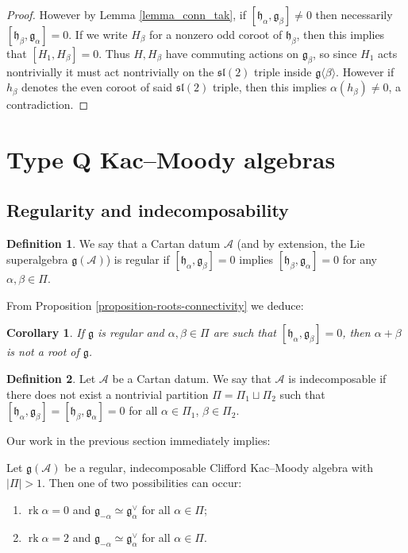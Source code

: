 \documentclass[12pt, a4paper, reqno]{amsart}
\def\AA{\mathcal{A}}
\def\g{\mathfrak{g}}
\def\h{\mathfrak{h}}
\def\l{\mathfrak{l}}
\def\s{\mathfrak{s}}
\def\rk{\operatorname{rk}}
\newtheorem{corollary}{Corollary}
\theoremstyle{definition}
\newtheorem{definition}{Definition}
\theoremstyle{definition}
\theoremstyle{definition}
\numberwithin{theorem}{section}
\numberwithin{lemma}{section}
\numberwithin{remark}{section}
\numberwithin{definition}{section}
\numberwithin{corollary}{section}
\numberwithin{proposition}{section}
\numberwithin{example}{section}
\begin{document}
\begin{proof}
		However by Lemma \ref{lemma_conn_tak}, if $[\h_{\alpha},\g_{\beta}]\neq0$ then necessarily $[\h_{\beta},\g_{\alpha}]=0$.  If we write $H_{\beta}$ for a nonzero odd coroot of $\h_{\beta}$, then this implies that $[H_1,H_\beta]=0$.  Thus $H,H_\beta$ have commuting actions on $\g_{\beta}$, so since $H_1$ acts nontrivially it must act nontrivially on the $\s\l(2)$ triple inside $\g\langle\beta\rangle$.  However if $h_{\beta}$ denotes the even coroot of said $\s\l(2)$ triple, then this implies $\alpha(h_{\beta})\neq0$, a contradiction. 
	\end{proof}
	
	\section{Type Q Kac--Moody algebras}\label{section-QKM}
	
	\subsection{Regularity and indecomposability} \begin{definition}\label{definition-regular}
		We say that a Cartan datum $\AA$ (and by extension, the Lie superalgebra \(\mathfrak{g}(\AA)\)) is regular if \([\h_{\alpha},\mathfrak{g}_{\beta}] = 0\) implies \([\h_{\beta},\mathfrak{g}_{\alpha}] = 0\) for any \(\alpha,\beta \in \Pi\). 
	\end{definition}
	
	From Proposition \ref{proposition-roots-connectivity} we deduce:
	
	\begin{corollary}\label{corollary-regular}
		If \(\mathfrak{g}\) is regular and \(\alpha,\beta \in \Pi\) are such that \([\h_{\alpha},\mathfrak{g}_{\beta}] = 0\), then \(\alpha+\beta\) is not a root of \(\mathfrak{g}\).
	\end{corollary}
	
	\begin{definition}
		Let $\AA$ be a Cartan datum.  We say that $\AA$ is indecomposable if there does not exist a nontrivial partition $\Pi=\Pi_1\sqcup\Pi_2$ such that $[\h_{\alpha},\g_{\beta}]=[\h_{\beta},\g_{\alpha}]=0$ for all $\alpha\in\Pi_1$, $\beta\in\Pi_2$.
	\end{definition}
	
	Our work in the previous section immediately implies:
	\begin{theorem}\label{theorem-connectivity-aKM}
		Let \(\mathfrak{g}(\mathcal{A})\) be a regular, indecomposable Clifford Kac--Moody algebra with $|\Pi|>1$.  Then one of two possibilities can occur: 
		\begin{enumerate}[label=(\roman*)]
			\item \(\rk\alpha =0\) and \(\mathfrak{g}_{-\alpha} \simeq \mathfrak{g}_{\alpha}^\vee\) for all $\alpha\in\Pi$;
			\item \(\rk\alpha =2\) and \(\mathfrak{g}_{-\alpha} \simeq \mathfrak{g}_{\alpha}^\vee\) for all $\alpha\in\Pi$.
		\end{enumerate}
	\end{theorem}
	
\end{document}
